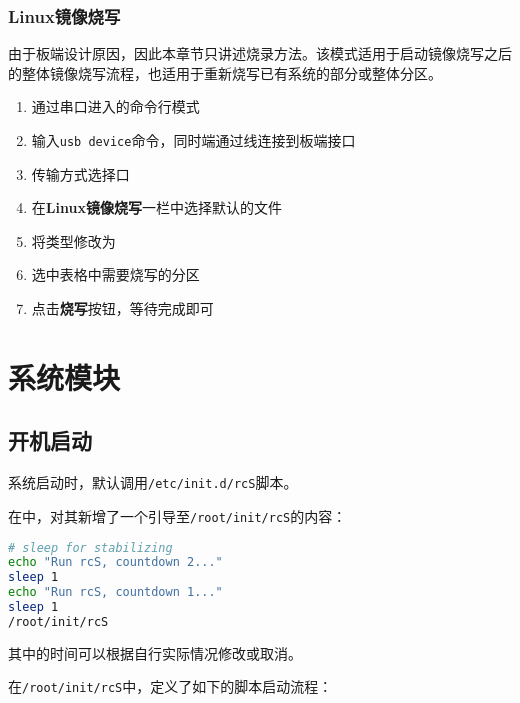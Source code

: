\documentclass[UTF8]{ctexart}
\newcommand{\code}[1]{\colorbox{gray!10}{\lstinline[style=inlinecode]|#1|}}
\begin{document}
\subsubsection{Linux镜像烧写}

由于板端设计原因，因此本章节只讲述烧录方法。该模式适用于启动镜像烧写之后的整体镜像烧写流程，也适用于重新烧写已有系统的部分或整体分区。

\begin{enumerate}
    \item 通过串口进入的命令行模式
    \item 输入\code{usb device}命令，同时端通过线连接到板端接口
    \item 传输方式选择口
    \item 在\textbf{Linux镜像烧写}一栏中选择默认的文件
    \item 将类型修改为
    \item 选中表格中需要烧写的分区
    \item 点击\textbf{烧写}按钮，等待完成即可
\end{enumerate}

\newpage


\section{系统模块}

\subsection{开机启动}

系统启动时，默认调用\code{/etc/init.d/rcS}脚本。

在中，对其新增了一个引导至\code{/root/init/rcS}的内容：

\begin{lstlisting}[language=sh]
# sleep for stabilizing
echo "Run rcS, countdown 2..."
sleep 1
echo "Run rcS, countdown 1..."
sleep 1
/root/init/rcS
\end{lstlisting}

\noindent 其中的时间可以根据自行实际情况修改或取消。

在\code{/root/init/rcS}中，定义了如下的脚本启动流程：
\end{document}
